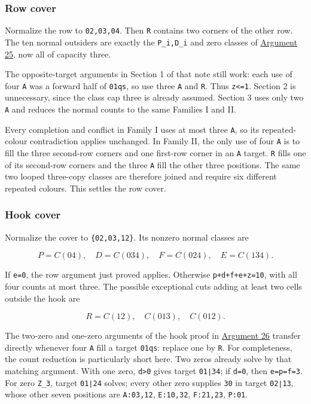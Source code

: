 \documentclass[
  10pt,
]{article}
\begin{document}
\hypertarget{row-cover}{%
\subsubsection*{Row cover}\label{row-cover}}

Normalize the row to \texttt{02,03,04}. Then \texttt{R} contains two
corners of the other row. The ten normal outsiders are exactly the
\texttt{P\_i,D\_i} and zero classes of
\protect\hyperlink{arg-25}{Argument 25}, now all of capacity three.

The opposite-target arguments in Section 1 of that note still work: each
use of four \texttt{A} was a forward half of \texttt{01\textbar{}qs}, so
use three \texttt{A} and \texttt{R}. Thus \texttt{z\textless{}=1}.
Section 2 is unnecessary, since the class cap three is already assumed.
Section 3 uses only two \texttt{A} and reduces the normal counts to the
same Families I and II.

Every completion and conflict in Family I uses at most three \texttt{A},
so its repeated-colour contradiction applies unchanged. In Family II,
the only use of four \texttt{A} is to fill the three second-row corners
and one first-row corner in an \texttt{A} target. \texttt{R} fills one
of its second-row corners and the three \texttt{A} fill the other three
positions. The same two looped three-copy classes are therefore joined
and require six different repeated colours. This settles the row cover.

\hypertarget{hook-cover}{%
\subsubsection*{Hook cover}\label{hook-cover}}

Normalize the cover to \texttt{\{02,03,12\}}. Its nonzero normal classes
are

\[
P=C(04),\quad D=C(034),\quad F=C(024),\quad E=C(134).
\]

If \texttt{e=0}, the row argument just proved applies. Otherwise
\texttt{p+d+f+e+z=10}, with all four counts at most three. The possible
exceptional cuts adding at least two cells outside the hook are

\[
R=C(12),\quad C(013),\quad C(012).
\]

The two-zero and one-zero arguments of the hook proof in
\protect\hyperlink{arg-26}{Argument 26} transfer directly whenever four
\texttt{A} fill a target \texttt{01\textbar{}qs}: replace one by
\texttt{R}. For completeness, the count reduction is particularly short
here. Two zeros already solve by that matching argument. With one zero,
\texttt{d\textgreater{}0} gives target \texttt{01∣34}; if \texttt{d=0},
then \texttt{e=p=f=3}. For zero \texttt{Z\_3}, target \texttt{01∣24}
solves; every other zero supplies \texttt{30} in target \texttt{02∣13},
whose other seven positions are \texttt{A:03,12}, \texttt{E:10,32},
\texttt{F:21,23}, \texttt{P:01}.
\end{document}
